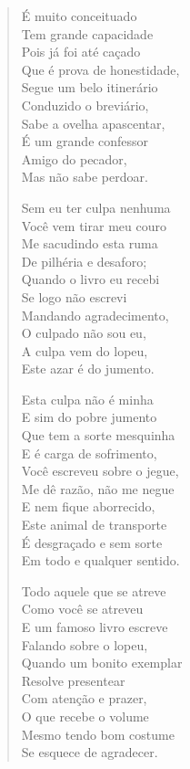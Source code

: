 \begin{verse}
É muito conceituado\\
Tem grande capacidade\\
Pois já foi até caçado\\
Que é prova de honestidade,\\
Segue um belo itinerário\\
Conduzido o breviário,\\
Sabe a ovelha apascentar,\\
É um grande confessor\\
Amigo do pecador,\\
Mas não sabe perdoar.

Sem eu ter culpa nenhuma\\
Você vem tirar meu couro\\
Me sacudindo esta ruma\\
De pilhéria e desaforo;\\
Quando o livro eu recebi\\
Se logo não escrevi\\
Mandando agradecimento,\\
O culpado não sou eu,\\
A culpa vem do lopeu,\\
Este azar é do jumento.

Esta culpa não é minha\\
E sim do pobre jumento\\
Que tem a sorte mesquinha\\
E é carga de sofrimento,\\
Você escreveu sobre o jegue,\\
Me dê razão, não me negue\\
E nem fique aborrecido,\\
Este animal de transporte\\
É desgraçado e sem sorte\\
Em todo e qualquer sentido.

Todo aquele que se atreve\\
Como você se atreveu\\
E um famoso livro escreve\\
Falando sobre o lopeu,\\
Quando um bonito exemplar\\
Resolve presentear\\
Com atenção e prazer,\\
O que recebe o volume\\
Mesmo tendo bom costume\\
Se esquece de agradecer.


\end{verse}
